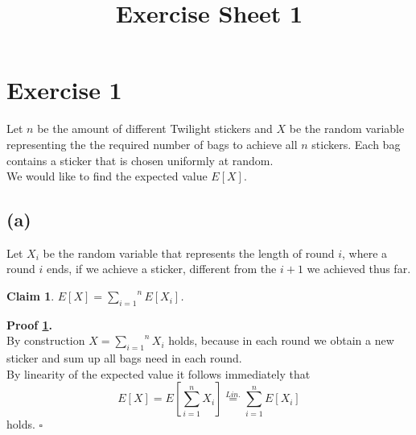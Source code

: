\documentclass[11pt,a4paper,ngerman]{article}
\date{}
\title{Exercise Sheet 1}
\author{}
\newtheorem{lemma}{\bfseries Claim}
\begin{document}

\renewcommand{\figurename}{Figure}

\maketitle
\thispagestyle{fancy}


\section*{Exercise 1} 

Let $n$ be the amount of different Twilight stickers and $X$ be the random variable representing the the required number of bags to achieve all $n$ stickers.
Each bag contains a sticker that is chosen uniformly at random.\\
We would like to find the expected value $E[X]$.


\subsection*{(a)}

Let $X_i$ be the random variable that represents the length of round $i$, where a round $i$ ends, if we achieve a sticker, different from the $i+1$ we
achieved thus far.

\begin{lemma}\label{ex1:t1:linearity}
    $E[X] = \overset{n}{\underset{i=1}{\sum}} E[X_i]$.
\end{lemma}

\textbf{Proof \ref{ex1:t1:linearity}.}\\
By construction $X = \overset{n}{\underset{i=1}{\sum}} X_i$ holds, because in each round we obtain a new sticker
and sum up all bags need in each round.\\
By linearity of the expected value it follows immediately that
$$
    E[X] = E \left[ \sum_{i=1}^{n} X_i \right] \stackrel{Lin.}{=} \sum_{i=1}^{n} E [X_i]
$$
holds.
\mbox{} \hfill $\square$

\end{document}
